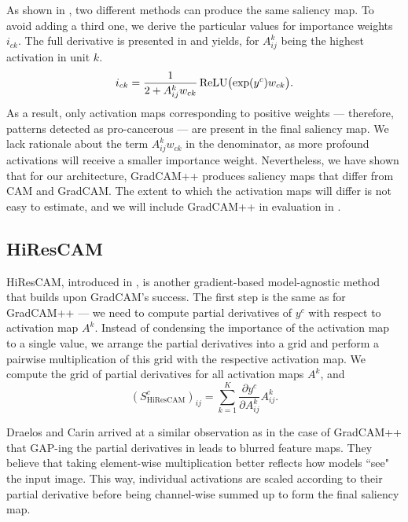 As shown in , two different methods can produce the same saliency map.
To avoid adding a third one, we derive the particular values for importance weights $i_{ck}$.
The full derivative is presented in  and yields, for $A^k_{ij}$ being the highest activation in unit $k$.
\begin{equation}
    i_{ck} = \frac{1}{2 + A^k_{ij}w_{ck}} \operatorname{ReLU}\bigl(\exp(y^c)w_{ck}\bigr).
\end{equation}
As a result, only activation maps corresponding to positive weights --- therefore, patterns detected as pro-cancerous --- are present in the final saliency map.
We lack rationale about the term $A^k_{ij} w_{ck}$ in the denominator, as more profound activations will receive a smaller importance weight.
Nevertheless, we have shown that for our architecture, GradCAM++ produces saliency maps that differ from CAM and GradCAM.
The extent to which the activation maps will differ is not easy to estimate, and we will include GradCAM++ in evaluation in .


\subsection{HiResCAM}\label{sub:hirescam}

HiResCAM, introduced in \cite{hires-cam}, is another gradient-based model-agnostic method that builds upon GradCAM's success.
The first step is the same as for GradCAM++ --- we need to compute partial derivatives of $y^c$ with respect to activation map $A^k$.
Instead of condensing the importance of the activation map to a single value, we arrange the partial derivatives into a grid and perform a pairwise multiplication of this grid with the respective activation map.
We compute the grid of partial derivatives for all activation maps $A^k$, and
\begin{equation}
    (S^c_{\text{HiResCAM}})_{ij}
        = \sum_{k=1}^K \frac{\partial y^c}{\partial A^k_{ij}} A^k_{ij}.
\end{equation}

Draelos and Carin \cite{hires-cam} arrived at a similar observation as in the case of GradCAM++ that GAP-ing the partial derivatives in  leads to blurred feature maps. 
They believe that taking element-wise multiplication better reflects how models ``see" the input image.
This way, individual activations are scaled according to their partial derivative before being channel-wise summed up to form the final saliency map.

